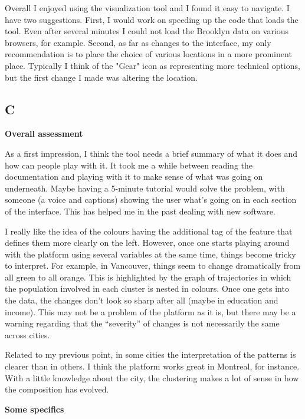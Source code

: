 \documentclass[a4paper]{article}
\newcommand{\censure}[1]{}
\begin{document}
Overall I enjoyed using the visualization tool and I found it easy to navigate.
I have two suggestions. First, I would work on speeding up the code that loads
the tool. Even after several minutes I could not load the Brooklyn data on
various browsers, for example. Second, as far as changes to the interface, my
only recommendation is to place the choice of various locations in a more
prominent place. Typically I think of the "Gear" icon as representing more
technical options, but the first change I made was altering the location.

\subsection{C \censure{- Fernando Calderón Figueroa}}
\censure{\emph{Doctoral candidate in Sociology at the University of Toronto, Canada}}


\textbf{Overall assessment}

As a first impression, I think the tool needs a brief summary of what it does
and how can people play with it. It took me a while between reading the
documentation and playing with it to make sense of what was going on underneath.
Maybe having a 5-minute tutorial would solve the problem, with someone (a voice
and captions) showing the user what’s going on in each section of the interface.
This has helped me in the past dealing with new software.

I really like the idea of the colours having the additional tag of the feature
that defines them more clearly on the left. However, once one starts playing
around with the platform using several variables at the same time, things become
tricky to interpret. For example, in Vancouver, things seem to change
dramatically from all green to all orange. This is highlighted by the graph of
trajectories in which the population involved in each cluster is nested in
colours. Once one gets into the data, the changes don't look so sharp after all
(maybe in education and income). This may not be a problem of the platform as it
is, but there may be a warning regarding that the “severity” of changes is not
necessarily the same across cities. 

Related to my previous point, in some cities the interpretation of the patterns
is clearer than in others. I think the platform works great in Montreal, for
instance. With a little knowledge about the city, the clustering makes a lot of
sense in how the composition has evolved. 

\textbf{Some specifics}
\end{document}

